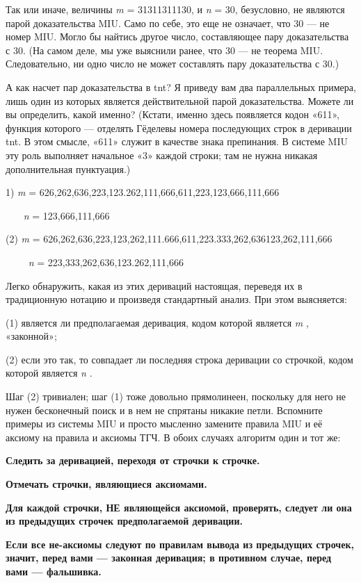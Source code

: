 \documentclass[../main.tex]{subfiles}
\begin{document}
Так или иначе, величины \emph{m} = 31311311130, и \emph{n} = 30, безусловно, не являются парой доказательства MIU\@. Само по себе, это еще не означает, что 30 --- не номер MIU\@. Могло бы найтись другое число, составляющее пару доказательства с 30. (На самом деле, мы уже выяснили ранее, что 30 --- не теорема MIU\@. Следовательно, ни одно число не может составлять пару доказательства с 30.)

А как насчет пар доказательства в \acs{tnt}? Я приведу вам два параллельных примера, лишь один из которых является действительной парой доказательства. Можете ли вы определить, какой именно? (Кстати, именно здесь появляется кодон «611», функция которого --- отделять Гёделевы номера последующих строк в деривации \acs{tnt}\@. В этом смысле, «611» служит в качестве знака препинания. В системе MIU эту роль выполняет начальное «3» каждой строки; там не нужна никакая дополнительная пунктуация.)

1) \emph{m} = 626,262,636,223,123.262,111,666,611,223,123,666,111,666

~~~ \emph{n} = 123,666,111,666

(2) \emph{m} = 626,262,636,223,123,262,111.666,611,223.333,262,636123,262,111,666

~~~~ \emph{n} = 223,333,262,636,123.262,111,666

Легко обнаружить, какая из этих дериваций настоящая, переведя их в традиционную нотацию и произведя стандартный анализ. При этом выясняется:

(1) является ли предполагаемая деривация, кодом которой является \emph{m} , «законной»;

(2) если это так, то совпадает ли последняя строка деривации со строчкой, кодом которой является \emph{n} .

Шаг (2) тривиален; шаг (1) тоже довольно прямолинеен, поскольку для него не нужен бесконечный поиск и в нем не спрятаны никакие петли. Вспомните примеры из системы MIU и просто мысленно замените правила MIU и её аксиому на правила и аксиомы ТГЧ\@. В обоих случаях алгоритм один и тот же:

\textbf{Следить за деривацией, переходя от строчки к строчке.}

\textbf{Отмечать строчки, являющиеся аксиомами.}

\textbf{Для каждой строчки, НЕ являющейся аксиомой, проверять, следует ли она из предыдущих строчек предполагаемой деривации.}

\textbf{Если все не-аксиомы следуют по правилам вывода из предыдущих строчек, значит, перед вами --- законная деривация; в противном случае, перед вами --- фальшивка.}
\end{document}
